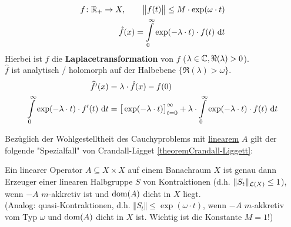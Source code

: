 \begin{align*}
f\colon\mathbb{R}_+\to X,\qquad\big\Vert f(t)\big\Vert\leq M\cdot\exp(\omega\cdot t)\\
\hat{f}(x)=\int\limits_0^\infty\exp(-\lambda\cdot t)\cdot f(t)\text{ d} t
\end{align*}
Hierbei ist $\hat{f}$ die \textbf{Laplacetransformation} von $f$ ($\lambda\in\mathbb{C},\Re(\lambda)>0$).\\
$\hat{f}$ ist analytisch / holomorph auf der Halbebene $\big\lbrace\Re(\lambda)>\omega\big\rbrace$. 
\begin{align*}
\widehat{f'}(x)&=\lambda\cdot\hat{f}(x)-f(0)\\
\int\limits_0^\infty\exp(-\lambda\cdot t)\cdot f'(t)\text{ d} t
&=\big[\exp(-\lambda\cdot t)\big]_{t=0}^\infty+\lambda\cdot\int\limits_0^\infty\exp(-\lambda\cdot t)\cdot f(t)\text{ d} t
\end{align*}

Bezüglich der Wohlgestelltheit des Cauchyproblems mit \ul{linearem} $A$ gilt der folgende "Spezialfall" von Crandall-Ligget \ref{theoremCrandall-Liggett}:

\begin{theorem}\enter
Ein linearer Operator $A\subseteq X\times X$ auf einem Banachraum $X$ ist genau dann Erzeuger einer linearen Halbgruppe $S$ von Kontraktionen (d.h. $\Vert S_t\Vert_{\mathcal{L}(X)}\leq 1$), wenn $-A$ $m$-akkretiv ist und $\operatorname{dom}(A)$ dicht in $X$ liegt.\\
(Analog: quasi-Kontraktionen, d.h. $\Vert S_t\Vert\leq\exp(\omega\cdot t)$, wenn $-A$ $m$-akkretiv vom Typ $\omega$ und $\operatorname{dom}(A)$ dicht in $X$ ist. Wichtig ist die Konstante $M=1$!)
\end{theorem}

